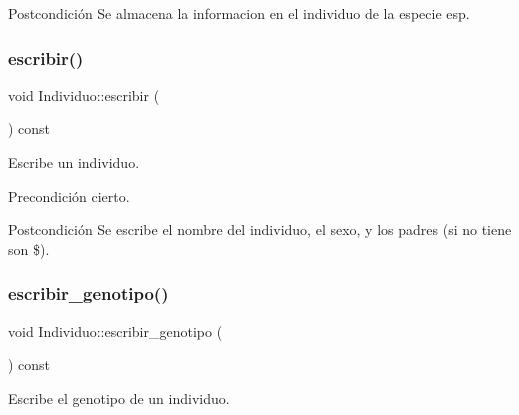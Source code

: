 \begin{DoxyPostcond}{Postcondición}
Se almacena la informacion en el individuo de la especie esp. 
\end{DoxyPostcond}
\mbox{\label{class_individuo_afa626864f948a749bfb3ca277c316105}} 
\subsubsection{\texorpdfstring{escribir()}{escribir()}}
{\footnotesize\ttfamily void Individuo\+::escribir (\begin{DoxyParamCaption}{ }\end{DoxyParamCaption}) const}



Escribe un individuo. 

\begin{DoxyPrecond}{Precondición}
cierto. 
\end{DoxyPrecond}
\begin{DoxyPostcond}{Postcondición}
Se escribe el nombre del individuo, el sexo, y los padres (si no tiene son \$). 
\end{DoxyPostcond}
\mbox{\label{class_individuo_a709b63adb89ff41fec3f2a59cbb560a2}} 
\subsubsection{\texorpdfstring{escribir\+\_\+genotipo()}{escribir\_genotipo()}}
{\footnotesize\ttfamily void Individuo\+::escribir\+\_\+genotipo (\begin{DoxyParamCaption}{ }\end{DoxyParamCaption}) const}



Escribe el genotipo de un individuo. 

